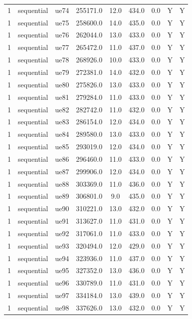 \begin{table}[ht]
\begin{tabular}{|c|c|c|c|c|c|c|c|c|}
1 & sequential & ue74 & 255171.0 & 12.0 & 434.0 & 0.0 & Y & Y \\
1 & sequential & ue75 & 258600.0 & 14.0 & 435.0 & 0.0 & Y & Y \\
1 & sequential & ue76 & 262044.0 & 13.0 & 433.0 & 0.0 & Y & Y \\
1 & sequential & ue77 & 265472.0 & 11.0 & 437.0 & 0.0 & Y & Y \\
1 & sequential & ue78 & 268926.0 & 10.0 & 433.0 & 0.0 & Y & Y \\
1 & sequential & ue79 & 272381.0 & 14.0 & 432.0 & 0.0 & Y & Y \\
1 & sequential & ue80 & 275826.0 & 13.0 & 433.0 & 0.0 & Y & Y \\
1 & sequential & ue81 & 279284.0 & 11.0 & 433.0 & 0.0 & Y & Y \\
1 & sequential & ue82 & 282742.0 & 11.0 & 432.0 & 0.0 & Y & Y \\
1 & sequential & ue83 & 286154.0 & 12.0 & 434.0 & 0.0 & Y & Y \\
1 & sequential & ue84 & 289580.0 & 13.0 & 433.0 & 0.0 & Y & Y \\
1 & sequential & ue85 & 293019.0 & 12.0 & 434.0 & 0.0 & Y & Y \\
1 & sequential & ue86 & 296460.0 & 11.0 & 433.0 & 0.0 & Y & Y \\
1 & sequential & ue87 & 299906.0 & 12.0 & 434.0 & 0.0 & Y & Y \\
1 & sequential & ue88 & 303369.0 & 11.0 & 436.0 & 0.0 & Y & Y \\
1 & sequential & ue89 & 306801.0 & 9.0 & 435.0 & 0.0 & Y & Y \\
1 & sequential & ue90 & 310221.0 & 13.0 & 432.0 & 0.0 & Y & Y \\
1 & sequential & ue91 & 313627.0 & 11.0 & 431.0 & 0.0 & Y & Y \\
1 & sequential & ue92 & 317061.0 & 11.0 & 433.0 & 0.0 & Y & Y \\
1 & sequential & ue93 & 320494.0 & 12.0 & 429.0 & 0.0 & Y & Y \\
1 & sequential & ue94 & 323936.0 & 11.0 & 437.0 & 0.0 & Y & Y \\
1 & sequential & ue95 & 327352.0 & 13.0 & 436.0 & 0.0 & Y & Y \\
1 & sequential & ue96 & 330789.0 & 11.0 & 431.0 & 0.0 & Y & Y \\
1 & sequential & ue97 & 334184.0 & 13.0 & 439.0 & 0.0 & Y & Y \\
1 & sequential & ue98 & 337626.0 & 13.0 & 432.0 & 0.0 & Y & Y \\

\end{tabular}
\end{table}
